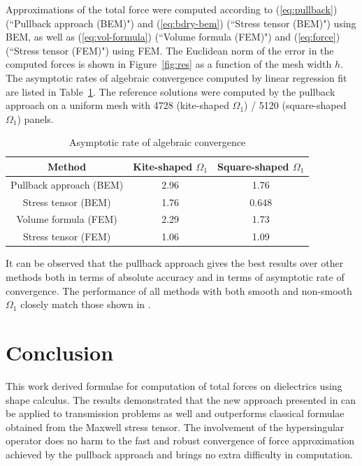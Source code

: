 \documentclass{article}
\theoremstyle{remark}
\begin{document}
 Approximations of the total force were computed according to (\ref{eq:pullback}) (``Pullback approach (BEM)") and (\ref{eq:bdry-bem}) (``Stress tensor (BEM)") using BEM, as well as (\ref{eq:vol-formula}) (``Volume formula (FEM)") and (\ref{eq:force}) (``Stress tensor (FEM)") using FEM. The Euclidean norm of the error in the computed forces is shown in Figure~\ref{fig:res} as a function of the mesh width $h$. The asymptotic rates of algebraic convergence computed by linear regression fit are listed in Table~\ref{tab:rate}. The reference solutions were computed by the pullback approach on a uniform mesh with 4728 (kite-shaped $\Omega_1$) / 5120 (square-shaped $\Omega_1$) panels.

\begin{table}[h!]
\centering
\caption{Asymptotic rate of algebraic convergence}
\begin{tabular}{|c|c|c|}
    \hline
    Method & Kite-shaped $\Omega_1$ & Square-shaped $\Omega_1$\\
    \hline
    Pullback approach (BEM) & 2.96 & 1.76 \\
    Stress tensor (BEM) & 1.76 & 0.648 \\
    Volume formula (FEM) & 2.29 & 1.73 \\
    Stress tensor (FEM) & 1.06 & 1.09 \\
    \hline
\end{tabular}
\label{tab:rate}
\end{table}

It can be observed that the pullback approach gives the best results over other methods both in terms of absolute accuracy and in terms of asymptotic rate of convergence. The performance of all methods with both smooth and non-smooth $\Omega_1$ closely match those shown in \cite{main}.

\section{Conclusion}
This work derived formulae for computation of total forces on dielectrics using shape calculus. The results demonstrated that the new approach presented in \cite{main} can be applied to transmission problems as well and outperforms classical formulae obtained from the Maxwell stress tensor. The involvement of the hypersingular operator does no harm to the fast and robust convergence of force approximation achieved by the pullback approach and brings no extra difficulty in computation.



\end{document}
